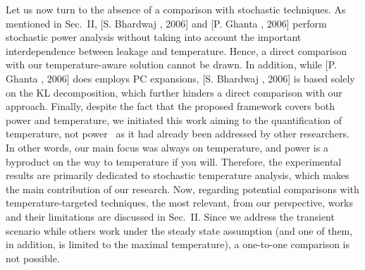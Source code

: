 \begin{authors}
Let us now turn to the absence of a comparison with stochastic techniques.
As mentioned in Sec.~II, [S. Bhardwaj \etal, 2006] and [P. Ghanta \etal, 2006] perform stochastic power analysis without taking into account the important interdependence between leakage and temperature.
Hence, a direct comparison with our temperature-aware solution cannot be drawn.
In addition, while [P. Ghanta \etal, 2006] does employs PC expansions, [S. Bhardwaj \etal, 2006] is based solely on the KL decomposition, which further hinders a direct comparison with our approach.
Finally, despite the fact that the proposed framework covers both power and temperature, we initiated this work aiming to the quantification of temperature, not power \perse\ as it had already been addressed by other researchers.
In other words, our main focus was always on temperature, and power is a byproduct on the way to temperature if you will.
Therefore, the experimental results are primarily dedicated to stochastic temperature analysis, which makes the main contribution of our research.
Now, regarding potential comparisons with temperature-targeted techniques, the most relevant, from our perspective, works and their limitations are discussed in Sec.~II.
Since we address the transient scenario while others work under the steady state assumption (and one of them, in addition, is limited to the maximal temperature), a one-to-one comparison is not possible.

\end{authors}

